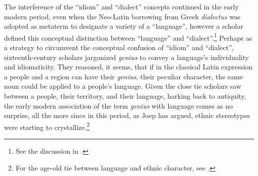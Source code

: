 \noindent The interference of the “idiom” and “dialect” concepts continued in the early modern period, even when the Neo-Latin borrowing from Greek \textit{dialectus} was adopted as metaterm to designate a variety of a “language”, however a scholar defined this conceptual distinction between “language” and “dialect”.\footnote{See the discussion in \citet[76--78]{van_rooy_language_2020}.} Perhaps as a strategy to circumvent the conceptual confusion of “idiom” and “dialect”, sixteenth-century scholars jargonized \textit{genius} to convey a language’s individuality and idiomaticity. They reasoned, it seems, that if in the classical Latin expression a people and a region can have their \textit{genius}, their peculiar character, the same noun could be applied to a people’s language. Given the close tie scholars saw between a people, their territory, and their language, harking back to antiquity, the early modern association of the term \textit{genius} with language comes as no surprise, all the more since in this period, as Joep \citet[17--32]{leerssen_imagology_2007} has argued, ethnic stereotypes were starting to crystallize.\footnote{For the age-old tie between language and ethnic character, see \citet{van_hal__2013}.}

